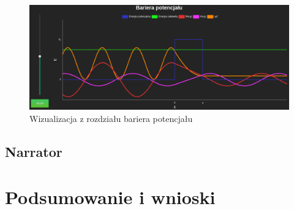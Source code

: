 \documentclass{SGGW-thesis}
\begin{document}
	\begin{figure}[H]
	\includegraphics[width=\textwidth,height=\textheight,keepaspectratio]{barrier.png} 
	\caption{Wizualizacja z rozdziału bariera potencjału}
	\label{fig:potential-barrier}
	\end{figure}
	
	\section{Narrator}
	
\chapter{Podsumowanie i wnioski}
\end{document}
